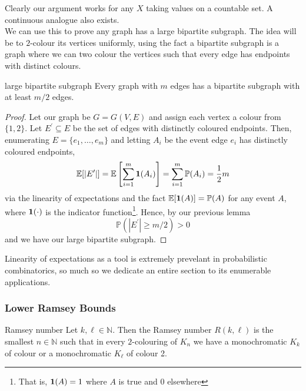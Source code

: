 \documentclass{article}
\begin{document}
Clearly our argument works for any $X$ taking values on a countable set. A continuous analogue also exists. \\ 

We can use this to prove any graph has a large bipartite subgraph. The idea will be to $2$-colour its vertices 
uniformly, using the fact a bipartite subgraph is a graph where we can two colour the vertices such that 
every edge has endpoints with distinct colours. 

\begin{proposition}[]{large bipartite subgraph}
    Every graph with $m$ edges has a bipartite subgraph with at least $m/2$ edges.
\end{proposition}

\begin{proof}
    Let our graph be $G = G(V, E)$ and assign each vertex a colour from $\{1, 2\}$. Let $E^\prime \subseteq E$ be 
    the set of edges with distinctly coloured endpoints. Then, enumerating $E = \{e_1, \dots, e_m\}$ and letting 
    $A_i$ be the event edge $e_i$ has distinctly coloured endpoints, 
    \[\mathbb{E}[|E^\prime|] = \mathbb{E}\left[\sum_{i = 1}^m{\bf 1}(A_i)\right] = \sum_{i=1}^m \mathbb{P}(A_i) = \frac{1}{2}m\]
    via the linearity of expectations and the fact $\mathbb{E}[{\bf 1}(A)] = \mathbb{P}(A)$ for any event $A$, 
    where ${\bf 1}(\cdot)$ is the indicator function\footnote{That is, ${\bf 1}(A) = 1$ where $A$ is true and $0$ elsewhere}. 
    Hence, by our previous lemma 
    \[\mathbb{P}(|E^\prime| \geq m/2) > 0\] 
    and we have our large bipartite subgraph.
\end{proof}

Linearity of expectations as a tool is extremely prevelant in probabilistic combinatorics, so much so 
we dedicate an entire section to its enumerable applications. \\ 

\subsubsection{Lower Ramsey Bounds}

\begin{definition}[]{Ramsey number}
    Let $k, \ell \in \mathbb{N}$. Then the Ramsey number $R(k, \ell)$ is the smallest $n \in \mathbb{N}$ such that 
    in every $2$-colouring of $K_n$ we have a monochromatic $K_k$ of colour or a monochromatic $K_\ell$ of colour 2.
\end{definition}
\end{document}
